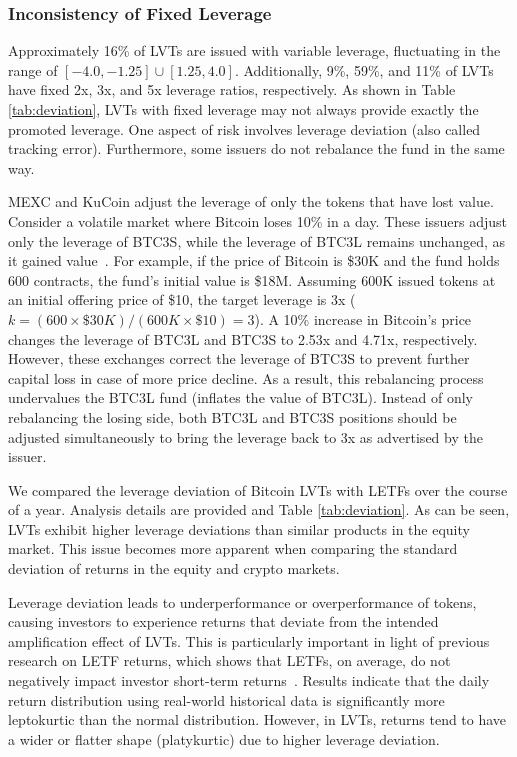 \subsubsection{Inconsistency of Fixed Leverage}
Approximately 16\% of LVTs are issued with variable leverage, fluctuating in the range of $\left[-4.0, -1.25 \right] \cup \left[ 1.25, 4.0 \right]$. Additionally, 9\%, 59\%, and 11\% of LVTs have fixed 2x, 3x, and 5x leverage ratios, respectively. As shown in Table \ref{tab:deviation}, LVTs with fixed leverage may not always provide exactly the promoted leverage. One aspect of risk involves leverage deviation (also called tracking error). Furthermore, some issuers do not rebalance the fund in the same way.


\begin{example}
	MEXC and KuCoin adjust the leverage of only the tokens that have lost value. Consider a volatile market where Bitcoin loses 10\% in a day. These issuers adjust only the leverage of BTC3S, while the leverage of BTC3L remains unchanged, as it gained value~\cite{MEXC_Guide,KuCoin_Leverage}. For example, if the price of Bitcoin is \$30K and the fund holds 600 contracts, the fund's initial value is \$18M. Assuming 600K issued tokens at an initial offering price of \$10, the target leverage is 3x (\ie \(k=(600\times{\$30K})/(600K\times{\$10})=3\)). A 10\% increase in Bitcoin's price changes the leverage of BTC3L and BTC3S to 2.53x and 4.71x, respectively. However, these exchanges correct the leverage of BTC3S to prevent further capital loss in case of more price decline. As a result, this rebalancing process undervalues the BTC3L fund (\ie inflates the value of BTC3L). Instead of only rebalancing the losing side, both BTC3L and BTC3S positions should be adjusted simultaneously to bring the leverage back to 3x as advertised by the issuer.
\end{example}

We compared the leverage deviation of Bitcoin LVTs with LETFs over the course of a year. Analysis details are provided and Table \ref{tab:deviation}. As can be seen, LVTs exhibit higher leverage deviations than similar products in the equity market. This issue becomes more apparent when comparing the standard deviation of returns in the equity and crypto markets. 

Leverage deviation leads to underperformance or overperformance of tokens, causing investors to experience returns that deviate from the intended amplification effect of LVTs. This is particularly important in light of previous research on LETF returns, which shows that LETFs, on average, do not negatively impact investor short-term returns~\cite{loviscek2014leveraged}. Results indicate that the daily return distribution using real-world historical data is significantly more leptokurtic than the normal distribution. However, in LVTs, returns tend to have a wider or flatter shape (platykurtic) due to higher leverage deviation.


